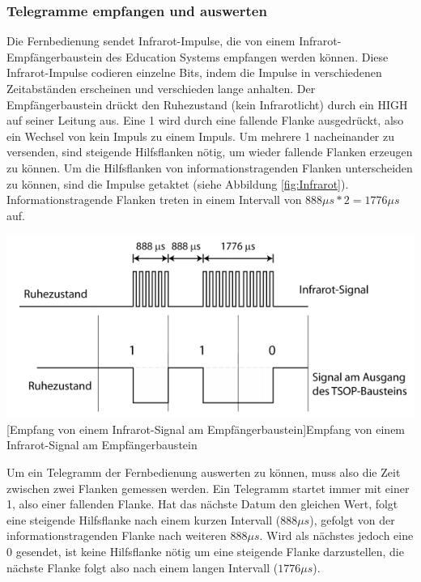 \documentclass[12pt,a4paper,bibliography=totocnumbered,listof=totocnumbered]{scrartcl}
\begin{document}
\subsubsection{Telegramme empfangen und auswerten}
Die Fernbedienung sendet Infrarot-Impulse, die von einem Infrarot-Empfängerbaustein des Education Systems empfangen werden können. Diese Infrarot-Impulse codieren einzelne Bits, indem die Impulse in verschiedenen Zeitabständen erscheinen und verschieden lange anhalten. Der Empfängerbaustein drückt den Ruhezustand (kein Infrarotlicht) durch ein HIGH auf seiner Leitung aus. Eine 1 wird durch eine fallende Flanke ausgedrückt, also ein Wechsel von kein Impuls zu einem Impuls. Um mehrere 1 nacheinander zu versenden, sind steigende Hilfsflanken nötig, um wieder fallende Flanken erzeugen zu können. Um die Hilfsflanken von informationstragenden Flanken unterscheiden zu können, sind die Impulse getaktet (siehe Abbildung \ref{fig:Infrarot}). Informationstragende Flanken treten in einem Intervall von \(888{\mu}s*2=1776{\mu}s\) auf.

\vspace{1em}
\begin{minipage}{\linewidth}
	\centering
	\includegraphics[width=1\linewidth]{img/Infrarot.png}
	[Empfang von einem Infrarot-Signal am Empfängerbaustein]{Empfang von einem Infrarot-Signal am Empfängerbaustein\footnotemark}
	\label{fig:Infrarot}
\end{minipage}


Um ein Telegramm der Fernbedienung auswerten zu können, muss also die Zeit zwischen zwei Flanken gemessen werden. Ein Telegramm startet immer mit einer 1, also einer fallenden Flanke. Hat das nächste Datum den gleichen Wert, folgt eine steigende Hilfsflanke nach einem kurzen Intervall (\(888{\mu}s\)), gefolgt von der informationstragenden Flanke nach weiteren \(888{\mu}s\). Wird als nächstes jedoch eine 0 gesendet, ist keine Hilfsflanke nötig um eine steigende Flanke darzustellen, die nächste Flanke folgt also nach einem langen Intervall (\(1776{\mu}s\)).
\end{document}
